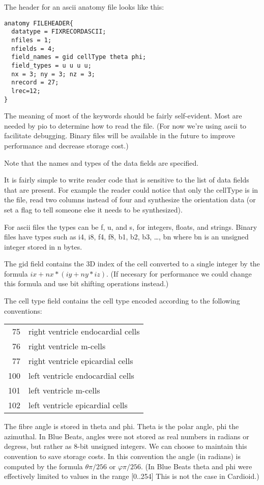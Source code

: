 \documentclass{article}
\begin{document}
The header for an ascii anatomy file looks like this:
\begin{verbatim}
anatomy FILEHEADER{
  datatype = FIXRECORDASCII;
  nfiles = 1;
  nfields = 4;
  field_names = gid cellType theta phi;
  field_types = u u u u;
  nx = 3; ny = 3; nz = 3;
  nrecord = 27;
  lrec=12;
}
\end{verbatim}
The meaning of most of the keywords should be fairly self-evident.  Most
are needed by pio to determine how to read the file.   (For now we're
using ascii to facilitate debugging.  Binary files will be available in
the future to improve performance and decrease storage cost.)


Note that the names and types of the data fields are specified.  

It is fairly simple to write reader code that is sensitive to the list
of data fields that are present.  For example the reader could notice
that only the cellType is in the file, read two columns instead of four
and synthesize the orientation data (or set a flag to tell someone else
it needs to be synthesized).

For ascii files the types can be f, u, and s, for integers, floats, and
strings.  Binary files have types such as i4, i8, f4, f8, b1, b2, b3, \ldots,
bn where bn is an unsigned integer stored in n bytes.

The gid field contains the 3D index of the cell converted to a single
integer by the formula $ix + nx*(iy + ny*iz)$.  (If necesary for
performance we could change this formula and use bit shifting operations
instead.)

The cell type field contains the cell type encoded according to the
following conventions:
\begin{center}
  \begin{tabular}{rl}
    75 & right ventricle endocardial cells\\
    76 & right ventricle m-cells\\
    77 & right ventricle epicardial cells\\
    100 & left ventricle endocardial cells\\
    101 & left ventricle m-cells\\
    102 & left ventricle epicardial cells\\
  \end{tabular}
\end{center}

The fibre angle is stored in theta and phi.  Theta is the polar angle,
phi the azimuthal.  In Blue Beats, angles were not stored as real
numbers in radians or degress, but rather as 8-bit unsigned integers.
We can choose to maintain this convention to save storage costs.  In
this convention the angle (in radians) is computed by the formula
$\theta\pi/256$ or $\varphi\pi/256$.  (In Blue Beats theta and phi were
effectively limited to values in the range [0..254]  This is not the
case in Cardioid.)
\end{document}
